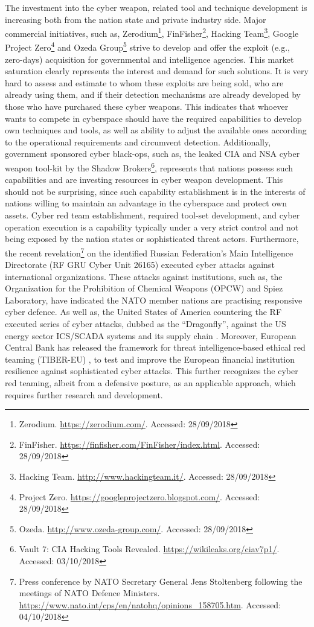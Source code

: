 The investment into the cyber weapon, related tool and technique development is increasing both from the nation state and private industry side.
Major commercial initiatives, such as, Zerodium\footnote{Zerodium. \url{https://zerodium.com/}. Accessed: 28/09/2018}, FinFisher\footnote{FinFisher. \url{https://finfisher.com/FinFisher/index.html}. Accessed: 28/09/2018}, Hacking Team\footnote{Hacking Team. \url{http://www.hackingteam.it/}. Accessed: 28/09/2018}, Google Project Zero\footnote{Project Zero. \url{https://googleprojectzero.blogspot.com/}. Accessed: 28/09/2018} and Ozeda Group\footnote{Ozeda. \url{http://www.ozeda-group.com/}. Accessed: 28/09/2018} strive to develop and offer the exploit (e.g., zero-days) acquisition for governmental and intelligence agencies.
This market saturation clearly represents the interest and demand for such solutions. It is very hard to assess and estimate to whom these exploits are being sold, who are already using them, and if their detection mechanisms are already developed by those who have purchased these cyber weapons.
This indicates that whoever wants to compete in cyberspace should have the required capabilities to develop own techniques and tools, as well as ability to adjust the available ones according to the operational requirements and circumvent detection.
Additionally, government sponsored cyber black-ops, such as, the leaked CIA and NSA cyber weapon tool-kit by the Shadow Brokers\footnote{Vault 7: CIA Hacking Tools Revealed. \url{https://wikileaks.org/ciav7p1/}. Accessed: 03/10/2018}, represents that nations possess such capabilities and are investing resources in cyber weapon development. This should not be surprising, since such capability establishment is in the interests of nations willing to maintain an advantage in the cyberspace and protect own assets.
Cyber red team establishment, required tool-set development, and cyber operation execution is a capability typically under a very strict control and not being exposed by the nation states or sophisticated threat actors.
Furthermore, the recent revelation\footnote{Press conference by NATO Secretary General Jens Stoltenberg following the meetings of NATO Defence Ministers. \url{https://www.nato.int/cps/en/natohq/opinions_158705.htm}. Accessed: 04/10/2018} on the identified Russian Federation's Main Intelligence Directorate (RF GRU Cyber Unit 26165) executed cyber attacks against international organizations. These attacks against institutions, such as, the Organization for the Prohibition of Chemical Weapons (OPCW) and Spiez Laboratory, have indicated the NATO member nations are practising responsive cyber defence. As well as, the United States of America countering the RF executed series of cyber attacks, dubbed as the ``Dragonfly'', against the US energy sector ICS/SCADA systems and its supply chain \cite{USCERT2018}.
Moreover, European Central Bank has released the framework for threat intelligence-based ethical red teaming (TIBER-EU) \cite{ECB2018}, to test and improve the European financial institution resilience against sophisticated cyber attacks. This further recognizes the cyber red teaming, albeit from a defensive posture, as an applicable approach, which requires further research and development.


